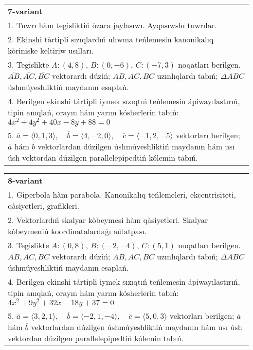 \documentclass{article}
\begin{document}
\begin{tabular}{m{17cm}}
\textbf{7-variant}\\
1. Tuwrı hàm tegisliktiń òzara jaylasıwı. Ayqasıwshı tuwrılar.\\

2. Ekinshi tàrtipli sızıqlardıń ulıwma teńlemesin kanonikalıq kòriniske keltiriw usılları.\\

3. Tegislikte $A: (4, 8)$, $B: (0, -6)$, $C: (-7, 3)$ noqatları berilgen. $\overline{AB}, \overline{AC}, \overline{BC}$ vektorardı dúziń; $AB, AC, BC$ uzınlıqlardı tabıń; $\Delta ABC$ úshmúyeshliktiń maydanın esaplań. \\

4. Berilgen ekinshi tártipli iymek sızıqtıń teńlemesin ápiwayılastırıń, tipin anıqlań, orayın hám yarım kósherlerin tabıń: $4x^2+4y^2+40x-8y+88=0$\\

5. \(\overline{a} = \langle 0, 1, 3 \rangle, \quad \overline{b} = \langle 4, -2, 0 \rangle, \quad \overline{c} = \langle -1, 2, -5 \rangle\) vektorları berilgen; \(\overline{a}\) hám \(\overline{b}\) vektorlardan dúzilgen úshmúyeshliktiń maydanın hám usı úsh vektordan dúzilgen parallelepipedtiń kólemin tabıń.
\end{tabular}
\vspace{1cm}


\begin{tabular}{m{17cm}}
\textbf{8-variant}\\
1. Giperbola hàm parabola. Kanonikalıq teńlemeleri, ekcentrisiteti, qàsiyetleri, grafikleri.\\

2. Vektorlardıń skalyar kòbeymesi hàm qàsiyetleri. Skalyar kòbeymeniń koordinatalardaǵı ańlatpası.\\

3. Tegislikte $A: (0, 8)$, $B: (-2, -4)$, $C: (5, 1)$ noqatları berilgen. $\overline{AB}, \overline{AC}, \overline{BC}$ vektorardı dúziń; $AB, AC, BC$ uzınlıqlardı tabıń; $\Delta ABC$ úshmúyeshliktiń maydanın esaplań. \\

4. Berilgen ekinshi tártipli iymek sızıqtıń teńlemesin ápiwayılastırıń, tipin anıqlań, orayın hám yarım kósherlerin tabıń: $4x^2+9y^2+32x-18y+37=0$\\

5. \(\overline{a} = \langle 3, 2, 1 \rangle, \quad \overline{b} = \langle -2, 1, -4 \rangle, \quad \overline{c} = \langle 5, 0, 3 \rangle\) vektorları berilgen; \(\overline{a}\) hám \(\overline{b}\) vektorlardan dúzilgen úshmúyeshliktiń maydanın hám usı úsh vektordan dúzilgen parallelepipedtiń kólemin tabıń.
\end{tabular}
\vspace{1cm}
\end{document}
